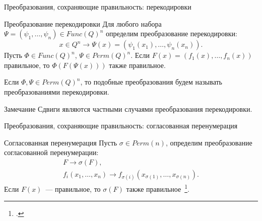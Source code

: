\begin{frame}{Преобразования, сохраняющие правильность: перекодировки}
    \begin{exampleblock}{Преобразование перекодировки}
        \label{thm:reencoding}
        Для любого набора $\Psi = (\psi_1, \ldots, \psi_n) \in Func(Q)^n$ определим преобразование перекодировки:
        \[
            x \in Q^n \to \Psi(x) = (\psi_1(x_1), \ldots, \psi_n(x_n)).
        \]
        Пусть $\Phi \in Func(Q)^n$, $\Psi \in Perm(Q)^n$.
        Если $F(x) = (f_1(x), \ldots, f_n(x))$ правильное, то $\Phi(F(\Psi(x)))$ также правильное.
    \end{exampleblock}
    \pause
    Если $\Phi, \Psi \in Perm(Q)^n$, то подобные преобразования будем называть преобразованиями перекодировки.
    \pause
    \begin{exampleblock}{Замечание}
        Сдвиги являются частными случаями преобразования перекодировки.
    \end{exampleblock}
\end{frame}


\begin{frame}{Преобразования, сохраняющие правильность: согласованная перенумерация}
    \begin{exampleblock}{Согласованная перенумерация}
        Пусть $\sigma \in Perm(n)$, определим преобразование согласованной перенумерации:
        \begin{gather*}
            F \to \sigma(F), \\
            f_i(x_1, \ldots, x_n) \to 
            f_{\sigma(i)}(x_{\sigma(1)}, \ldots, x_{\sigma(n)}).
        \end{gather*}
        \pause
        Если $F(x)$~--- правильное, то $\sigma(F)$ также правильное~\footcite{nosov08}.
    \end{exampleblock}
\end{frame}


